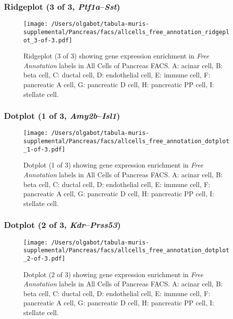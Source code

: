 \clearpage

\subsubsection{Ridgeplot (3 of 3, \emph{Ptf1a}--\emph{Sst})}
\begin{figure}[h]
\centering
\texttt{[image: /Users/olgabot/tabula-muris-supplemental/Pancreas/facs/allcells\_free\_annotation\_ridgeplot\_3-of-3.pdf]}

\caption{ Ridgeplot (3 of 3)  showing gene expression enrichment in \emph{Free Annotation} labels in All Cells of Pancreas FACS. A: acinar cell, B: beta cell, C: ductal cell, D: endothelial cell, E: immune cell, F: pancreatic A cell, G: pancreatic D cell, H: pancreatic PP cell, I: stellate cell.}
\end{figure}


\clearpage

\subsubsection{Dotplot (1 of 3, \emph{Amy2b}--\emph{Isl1})}
\begin{figure}[h]
\centering
\texttt{[image: /Users/olgabot/tabula-muris-supplemental/Pancreas/facs/allcells\_free\_annotation\_dotplot\_1-of-3.pdf]}

\caption{ Dotplot (1 of 3)  showing gene expression enrichment in \emph{Free Annotation} labels in All Cells of Pancreas FACS. A: acinar cell, B: beta cell, C: ductal cell, D: endothelial cell, E: immune cell, F: pancreatic A cell, G: pancreatic D cell, H: pancreatic PP cell, I: stellate cell.}
\end{figure}


\clearpage

\subsubsection{Dotplot (2 of 3, \emph{Kdr}--\emph{Prss53})}
\begin{figure}[h]
\centering
\texttt{[image: /Users/olgabot/tabula-muris-supplemental/Pancreas/facs/allcells\_free\_annotation\_dotplot\_2-of-3.pdf]}

\caption{ Dotplot (2 of 3)  showing gene expression enrichment in \emph{Free Annotation} labels in All Cells of Pancreas FACS. A: acinar cell, B: beta cell, C: ductal cell, D: endothelial cell, E: immune cell, F: pancreatic A cell, G: pancreatic D cell, H: pancreatic PP cell, I: stellate cell.}
\end{figure}


